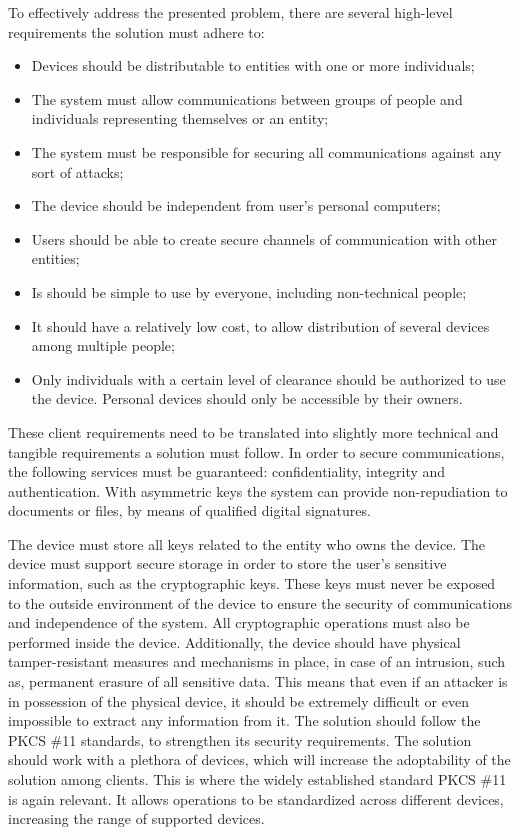 To effectively address the presented problem, there are several high-level requirements the solution must adhere to:
\begin{itemize}
	\item Devices should be distributable to entities with one or more individuals;
	\item The system must allow communications between groups of people and individuals representing themselves or an entity;
	\item The system must be responsible for securing all communications against any sort of attacks;
	\item The device should be independent from user's personal computers;
	\item Users should be able to create secure channels of communication with other entities;
	\item Is should be simple to use by everyone, including non-technical people;
	\item It should have a relatively low cost, to allow distribution of several devices among multiple people;
	\item Only individuals with a certain level of clearance should be authorized to use the device. Personal devices should only be accessible by their owners.
\end{itemize}

These client requirements need to be translated into slightly more technical and tangible requirements a solution must follow.
In order to secure communications, the following services must be guaranteed: confidentiality, integrity and authentication.
With asymmetric keys the system can provide non-repudiation to documents or files, by means of qualified digital signatures.

The device must store all keys related to the entity who owns the device.
The device must support secure storage in order to store the user's sensitive information, such as the cryptographic keys.
These keys must never be exposed to the outside environment of the device to ensure the security of communications and independence of the system.
All cryptographic operations must also be performed inside the device.
Additionally, the device should have physical tamper-resistant measures and mechanisms in place, in case of an intrusion, such as, permanent erasure of all sensitive data. 
This means that even if an attacker is in possession of the physical device, it should be extremely difficult or even impossible to extract any information from it.
The solution should follow the \ac{PKCS} \#11 standards, to strengthen its security requirements.
The solution should work with a plethora of devices, which will increase the adoptability of the solution among clients.
This is where the widely established standard \ac{PKCS} \#11 is again relevant. It allows operations to be standardized across different devices, increasing the range of supported devices.

